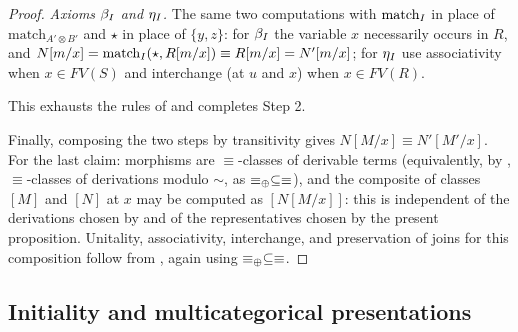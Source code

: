 \begin{proof}
\emph{Axioms $\beta_{I}$ and $\eta_{I}$.}
The same two computations with $\text{match}_{I}$ in place of $\text{match}_{A' \otimes B'}$ and $\star$ in place of $\{y, z\}$: for $\beta_{I}$ the variable $x$ necessarily occurs in $R$, and $N[m/x] = \text{match}_{I}(\star, R[m/x]) \equiv R[m/x] = N'[m/x]$; for $\eta_{I}$ use associativity when $x \in FV(S)$ and interchange (at $u$ and $x$) when $x \in FV(R)$.

This exhausts the rules of  and completes Step 2.

Finally, composing the two steps by transitivity gives $N[M/x] \equiv N'[M'/x]$.
For the last claim: morphisms are $\equiv$-classes of derivable terms (equivalently, by , $\equiv$-classes of derivations modulo $\sim$, as $\equiv_{\mathbin{\oplus}} \subseteq \equiv$), and the composite of classes $[M]$ and $[N]$ at $x$ may be computed as $[N[M/x]]$: this is independent of the derivations chosen by  and of the representatives chosen by the present proposition.
Unitality, associativity, interchange, and preservation of joins for this composition follow from , again using $\equiv_{\mathbin{\oplus}} \subseteq \equiv$.
\end{proof}

\subsection{Initiality and multicategorical presentations}
\label{app:initiality-details}

